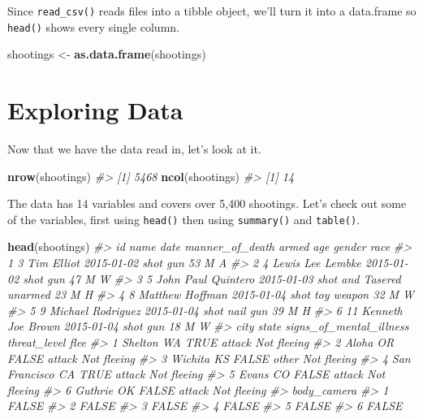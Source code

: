 \documentclass[
  12pt,
]{book}
\newenvironment{Shaded}{\begin{snugshade}}{\end{snugshade}}
\newcommand{\CommentTok}[1]{\textcolor[rgb]{0.56,0.35,0.01}{\textit{#1}}}
\newcommand{\KeywordTok}[1]{\textcolor[rgb]{0.13,0.29,0.53}{\textbf{#1}}}
\newcommand{\NormalTok}[1]{#1}
\newcommand{\StringTok}[1]{\textcolor[rgb]{0.31,0.60,0.02}{#1}}
\begin{document}
Since \texttt{read\_csv()} reads files into a tibble object, we'll turn it into a data.frame so \texttt{head()} shows every single column.

\begin{Shaded}
\begin{Highlighting}[]
\NormalTok{shootings <{-}}\StringTok{ }\KeywordTok{as.data.frame}\NormalTok{(shootings)}
\end{Highlighting}
\end{Shaded}

\hypertarget{exploring-data}{%
\section{Exploring Data}\label{exploring-data}}

Now that we have the data read in, let's look at it.

\begin{Shaded}
\begin{Highlighting}[]
\KeywordTok{nrow}\NormalTok{(shootings)}
\CommentTok{\#> [1] 5468}
\KeywordTok{ncol}\NormalTok{(shootings)}
\CommentTok{\#> [1] 14}
\end{Highlighting}
\end{Shaded}

The data has 14 variables and covers over 5,400 shootings. Let's check out some of the variables, first using \texttt{head()} then using \texttt{summary()} and \texttt{table()}.

\begin{Shaded}
\begin{Highlighting}[]
\KeywordTok{head}\NormalTok{(shootings)}
\CommentTok{\#>   id               name       date  manner\_of\_death      armed age gender race}
\CommentTok{\#> 1  3         Tim Elliot 2015{-}01{-}02             shot        gun  53      M    A}
\CommentTok{\#> 2  4   Lewis Lee Lembke 2015{-}01{-}02             shot        gun  47      M    W}
\CommentTok{\#> 3  5 John Paul Quintero 2015{-}01{-}03 shot and Tasered    unarmed  23      M    H}
\CommentTok{\#> 4  8    Matthew Hoffman 2015{-}01{-}04             shot toy weapon  32      M    W}
\CommentTok{\#> 5  9  Michael Rodriguez 2015{-}01{-}04             shot   nail gun  39      M    H}
\CommentTok{\#> 6 11  Kenneth Joe Brown 2015{-}01{-}04             shot        gun  18      M    W}
\CommentTok{\#>            city state signs\_of\_mental\_illness threat\_level        flee}
\CommentTok{\#> 1       Shelton    WA                    TRUE       attack Not fleeing}
\CommentTok{\#> 2         Aloha    OR                   FALSE       attack Not fleeing}
\CommentTok{\#> 3       Wichita    KS                   FALSE        other Not fleeing}
\CommentTok{\#> 4 San Francisco    CA                    TRUE       attack Not fleeing}
\CommentTok{\#> 5         Evans    CO                   FALSE       attack Not fleeing}
\CommentTok{\#> 6       Guthrie    OK                   FALSE       attack Not fleeing}
\CommentTok{\#>   body\_camera}
\CommentTok{\#> 1       FALSE}
\CommentTok{\#> 2       FALSE}
\CommentTok{\#> 3       FALSE}
\CommentTok{\#> 4       FALSE}
\CommentTok{\#> 5       FALSE}
\CommentTok{\#> 6       FALSE}
\end{Highlighting}
\end{Shaded}
\end{document}
